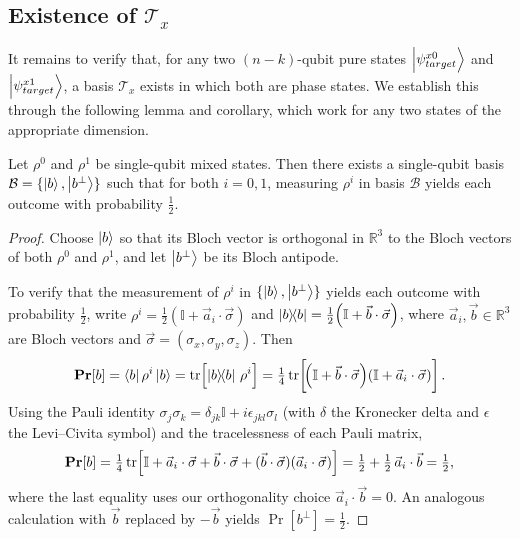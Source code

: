 \subsection{Existence of $\mathcal{T}_x$}\label{sec:existence}
It remains to verify that, for any two $(n-k)$-qubit pure states $\ket{\psi_{target}^{x0}}$ and $\ket{\psi_{target}^{x1}}$, a basis $\mathcal{T}_x$ exists in which both are phase states. We establish this through the following lemma and corollary, which work for any two states of the appropriate dimension.

\begin{lemma}\label{lem:perpy}
    Let $\rho^0$ and $\rho^1$ be single-qubit mixed states. Then there exists a single-qubit basis $\mathcal{B} = \{\ket{b}, \ket{b^\bot}\}$ such that for both $i = 0, 1$, measuring $\rho^i$ in basis $\mathcal{B}$ yields each outcome with probability $\tfrac{1}{2}$.
\end{lemma}

\begin{proof}
    Choose $\ket{b}$ so that its Bloch vector is orthogonal in $\mathbb{R}^3$ to the Bloch vectors of both $\rho^0$ and $\rho^1$, and let $\ket{b^\bot}$ be its Bloch antipode.

    To verify that the measurement of $\rho^i$ in $\{\ket{b}, \ket{b^\bot}\}$ yields each outcome with probability $\tfrac{1}{2}$, write $\rho^i = \tfrac{1}{2}\!\left(\mathbb{I} + \vec{a}_i\cdot\vec{\sigma}\right)$ and $\ketbra{b}{b} = \tfrac{1}{2}\!\left(\mathbb{I} + \vec{b}\cdot\vec{\sigma}\right)$, where $\vec{a}_i, \vec{b} \in \mathbb{R}^3$ are Bloch vectors and $\vec{\sigma} = (\sigma_x, \sigma_y, \sigma_z)$. Then
    \[
        \operatorname{{\bf Pr}}[b] = \bra{b}\rho^i\ket{b} = \tr\!\left[\ketbra{b}{b}\,\rho^i\right] = \tfrac{1}{4}\tr\!\left[\!\left(\mathbb{I} + \vec{b}\cdot\vec{\sigma}\right)\!\left(\mathbb{I} + \vec{a}_i\cdot\vec{\sigma}\right)\right].
    \]
    Using the Pauli identity $\sigma_j\sigma_k = \delta_{jk}\mathbb{I} + i\epsilon_{jkl}\sigma_l$ (with $\delta$ the Kronecker delta and $\epsilon$ the Levi--Civita symbol) and the tracelessness of each Pauli matrix,
    \[
        \operatorname{{\bf Pr}}[b] = \tfrac{1}{4}\tr\!\left[\mathbb{I} + \vec{a}_i\cdot\vec{\sigma} + \vec{b}\cdot\vec{\sigma} + (\vec{b}\cdot\vec{\sigma})(\vec{a}_i\cdot\vec{\sigma})\right] = \tfrac{1}{2} + \tfrac{1}{2}\,\vec{a}_i\cdot\vec{b} = \tfrac{1}{2},
    \]
    where the last equality uses our orthogonality choice $\vec{a}_i\cdot\vec{b} = 0$. An analogous calculation with $\vec{b}$ replaced by $-\vec{b}$ yields $\Pr[b^\bot] = \tfrac{1}{2}$.
\end{proof}


